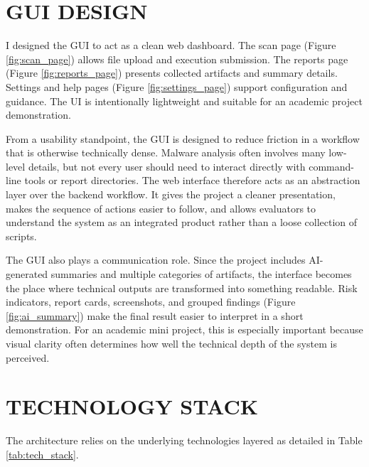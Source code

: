 \documentclass[a4paper,12pt,oneside]{report}
\begin{document}
\section{GUI DESIGN}
I designed the GUI to act as a clean web dashboard. The scan page (Figure \ref{fig:scan_page}) allows file upload and execution submission. The reports page (Figure \ref{fig:reports_page}) presents collected artifacts and summary details. Settings and help pages (Figure \ref{fig:settings_page}) support configuration and guidance. The UI is intentionally lightweight and suitable for an academic project demonstration.

\par

\par

From a usability standpoint, the GUI is designed to reduce friction in a workflow that is otherwise technically dense. Malware analysis often involves many low-level details, but not every user should need to interact directly with command-line tools or report directories. The web interface therefore acts as an abstraction layer over the backend workflow. It gives the project a cleaner presentation, makes the sequence of actions easier to follow, and allows evaluators to understand the system as an integrated product rather than a loose collection of scripts.

\par

\par

The GUI also plays a communication role. Since the project includes AI-generated summaries and multiple categories of artifacts, the interface becomes the place where technical outputs are transformed into something readable. Risk indicators, report cards, screenshots, and grouped findings (Figure \ref{fig:ai_summary}) make the final result easier to interpret in a short demonstration. For an academic mini project, this is especially important because visual clarity often determines how well the technical depth of the system is perceived.
\section{TECHNOLOGY STACK}
The architecture relies on the underlying technologies layered as detailed in Table \ref{tab:tech_stack}.
\end{document}
